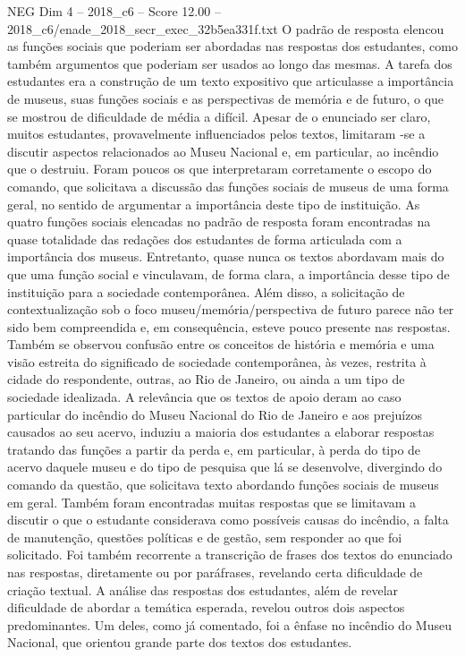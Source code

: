 \begin{textsample}{NEG Dim 4 – 2018\_c6 – Score 12.00 – 2018\_c6/enade\_2018\_secr\_exec\_32b5ea331f.txt}
O padrão de resposta elencou as funções sociais que poderiam ser abordadas nas respostas dos estudantes, como também argumentos que poderiam ser usados ao longo das mesmas.
A tarefa dos estudantes era a construção de um texto expositivo que articulasse a importância de museus, suas funções sociais e as perspectivas de memória e de futuro, o que se mostrou de dificuldade de média a difícil.
Apesar de o enunciado ser claro, muitos estudantes, provavelmente influenciados pelos textos, limitaram -se a discutir aspectos relacionados ao Museu Nacional e, em particular, ao incêndio que o destruiu.
Foram poucos os que interpretaram corretamente o escopo do comando, que solicitava a discussão das funções sociais de museus de uma forma geral, no sentido de argumentar a importância deste tipo de instituição.
As quatro funções sociais elencadas no padrão de resposta foram encontradas na quase totalidade das redações dos estudantes de forma articulada com a importância dos museus.
Entretanto, quase nunca os textos abordavam mais do que uma função social e vinculavam, de forma clara, a importância desse tipo de instituição para a sociedade contemporânea.
Além disso, a solicitação de contextualização sob o foco museu/memória/perspectiva de futuro parece não ter sido bem compreendida e, em consequência, esteve pouco presente nas respostas.
Também se observou confusão entre os conceitos de história e memória e uma visão estreita do significado de sociedade contemporânea, às vezes, restrita à cidade do respondente, outras, ao Rio de Janeiro, ou ainda a um tipo de sociedade idealizada.
A relevância que os textos de apoio deram ao caso particular do incêndio do Museu Nacional do Rio de Janeiro e aos prejuízos causados ao seu acervo, induziu a maioria dos estudantes a elaborar respostas tratando das funções a partir da perda e, em particular, à perda do tipo de acervo daquele museu e do tipo de pesquisa que lá se desenvolve, divergindo do comando da questão, que solicitava texto abordando funções sociais de museus em geral.
Também foram encontradas muitas respostas que se limitavam a discutir o que o estudante considerava como possíveis causas do incêndio, a falta de manutenção, questões políticas e de gestão, sem responder ao que foi solicitado.
Foi também recorrente a transcrição de frases dos textos do enunciado nas respostas, diretamente ou por paráfrases, revelando certa dificuldade de criação textual.
A análise das respostas dos estudantes, além de revelar dificuldade de abordar a temática esperada, revelou outros dois aspectos predominantes.
Um deles, como já comentado, foi a ênfase no incêndio do Museu Nacional, que orientou grande parte dos textos dos estudantes.

\end{textsample}
